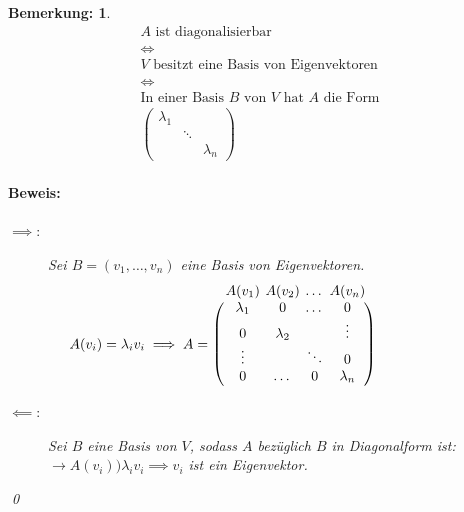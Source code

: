 \documentclass{report}
\newcommand{\lb}{\lambda}
\theoremstyle{customrem}
\newtheorem*{bemerkung}{Bemerkung\textnormal:}
\theoremstyle{customdef}
\renewenvironment{proof}{\paragraph{Beweis: }}{\qed}
\theoremstyle{customenv}
\begin{document}
	\begin{bemerkung}
		\begin{gather*}
			\text{\(A\) ist diagonalisierbar}\\
			\iff\\
			\text{\(V\) besitzt eine Basis von Eigenvektoren}\\
			\iff\\
			\text{In einer Basis \(B\) von \(V\) hat \(A\) die Form} \\
			\begin{pmatrix}
				\lb_1	&		&\\
						&\ddots	&\\
						&		&\lb_n
			\end{pmatrix}
		\end{gather*}
		\begin{proof}
			\begin{description}
				\item[\(\implies\)\normalfont:] Sei \(B=(v_1,\ldots, v_n)\) eine Basis von Eigenvektoren.
				\[{\setlength\arraycolsep{2pt}
					A(v_i)=\lb_iv_i \implies A = \raise.25cm\hbox{$
					\begin{matrix}
						\left(
						\phantom{\begin{matrix}
							A(v_1)	& A(v_2)& \cdots& A(v_n)\\
							0		& \lb_2	& 		& \vdots\\
							\vdots	& 		& \ddots& 0\\
							0		& \dots & 0		& \lb_n
							\end{matrix}}\right)\kern-3.85cm
						\raise.25cm\hbox{$
						\begin{matrix}
							A(v_1)	& A(v_2)& \dots & A(v_n)\\
							\lb_1	&	0	& \dots	& 0\\
							0		& \lb_2	& 		& \vdots\\
							\vdots	& 		& \ddots& 0\\
							0		& \dots & 0		& \lb_n
						\end{matrix}$}
					\end{matrix}$}\hphantom{A(v_i)=\lb_iv_i \implies A }}
				\]
				\item[\(\impliedby\)\normalfont:] Sei \(B\) eine Basis von \(V\), sodass \(A\) bezüglich \(B\) in Diagonalform ist: \(\rightarrow A(v_i) )\lb_iv_i\implies v_i\) ist ein Eigenvektor.
			\end{description}
		\end{proof}
	\end{bemerkung}
\end{document}
